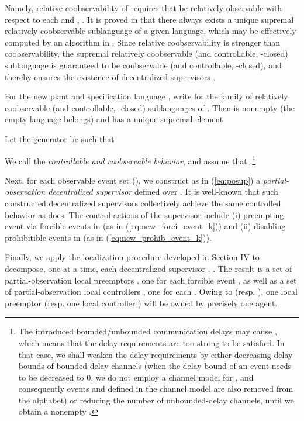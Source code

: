 Namely, relative coobservability of  requires that  be relatively observable with
respect to each  and , .
It is proved in
\cite{CaiZW16} that there always exists a unique supremal
relatively coobservable sublanguage of a given language, which may be effectively computed  by an algorithm in \cite{CaiZW16}. Since relative coobservability is stronger
than coobservability, the supremal relatively coobservable (and controllable, -closed) sublanguage is guaranteed
to be coobservable (and controllable, -closed), and
thereby ensures the existence of decentralized supervisors \cite{RudWon:1992,ParkChoi09}. 

For the new plant  and specification language ,
write  for the
family of relatively coobservable (and controllable, -closed) sublanguages of .
Then  is nonempty
(the empty language  belongs) and has a unique
supremal element

Let the generator  be such that

We call  the {\it controllable and coobservable
behavior}, and assume that .\footnote{The introduced
bounded/unbounded communication delays may cause ,
which means that the delay requirements are too strong to be satisfied. In that case,
we shall weaken the delay requirements by either decreasing delay bounds of bounded-delay channels
(when the delay bound of an event  needs to be decreased to 0, we do not employ a channel model
for , and consequently events  and  defined in the channel model are also removed from the alphabet)
or reducing the number of unbounded-delay channels, until we
obtain a nonempty . }

Next, for each observable event set  (),
we construct as in (\ref{eq:posup}) a {\it partial-observation decentralized supervisor}
 defined over . It is well-known \cite{RudWon:1992,LinWon95}
that such constructed decentralized supervisors 
collectively achieve the same controlled behavior as 
does.
The control actions of the supervisor 
include (i) preempting event  via forcible events in  (as in (\ref{eq:new_forci_event_k}))
and (ii) disabling prohibitible events in  (as in (\ref{eq:new_prohib_event_k})).

Finally, we apply the localization procedure developed in Section IV to decompose,
one at a time, each decentralized supervisor , .
The result is a set of partial-observation local preemptors , one for each forcible
event , as well as a set of partial-observation local controllers , one for each .
Owing to 
(resp. ),
one local preemptor  (resp. one local controller )
will be owned by precisely one agent.

